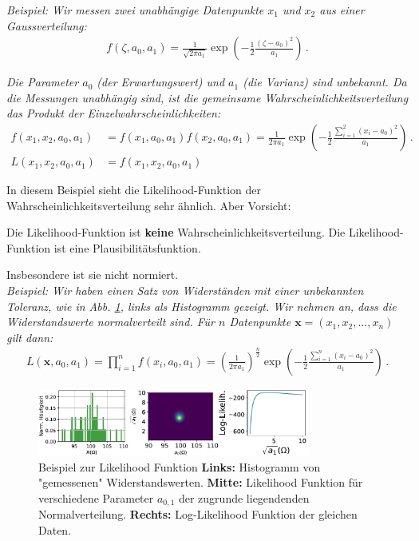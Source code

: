\textit{Beispiel: Wir messen zwei unabh\"angige Datenpunkte $x_1$ und $x_2$ aus einer Gaussverteilung:}
\begin{align}
f(\zeta, a_0, a_1) = \frac{1}{ \sqrt{ 2 \pi a_1 } } \exp \left( - \frac{1}{2} \frac{ (\zeta - a_0)^2 }{ a_1 } \right)\,.
\label{eq:vl8-4}
\end{align}

\textit{Die Parameter $a_0$ (der Erwartungswert) und $a_1$ (die Varianz) sind unbekannt. Da die Messungen unabh\"angig sind, ist die gemeinsame Wahrscheinlichkeitsverteilung das Produkt der Einzelwahrscheinlichkeiten:}
\begin{align}
f(x_1, x_2, a_0, a_1) &= f(x_1, a_0, a_1)f(x_2, a_0, a_1) = \frac{1}{ 2 \pi a_1 } \exp \left( - \frac{1}{2} \frac{ \sum_{i=1}^2 (x_i - a_0)^2 }{ a_1 } \right)\,. \\
L(x_1, x_2, a_0, a_1) &= f(x_1, x_2, a_0, a_1)
\label{eq:vl8-5}
\end{align}

In diesem Beispiel sieht die Likelihood-Funktion der Wahrscheinlichkeitsverteilung sehr \"ahnlich. Aber Vorsicht:

\begin{center}
\begin{tcolorbox}[enhanced,width=6in,drop fuzzy shadow southwest,
    colframe=red!50!black,colback=red!05]
   Die Likelihood-Funktion ist \textbf{keine} Wahrscheinlichkeitsverteilung. Die Likelihood-Funktion ist eine Plausibilitätsfunktion.
\end{tcolorbox}
\end{center}

Insbesondere ist sie nicht normiert.\\[0.3cm]
\textit{Beispiel: Wir haben einen Satz von Widerst\"anden mit einer unbekannten Toleranz, wie in Abb. \ref{fig:likelihood}, links als Histogramm gezeigt.
Wir nehmen an, dass die Widerstandswerte normalverteilt sind. F\"ur $n$ Datenpunkte $\boldsymbol{x} = (x_1, x_2, ..., x_n)$ gilt dann:}
\begin{align}
L(\boldsymbol{x}, a_0, a_1) =  \prod_{i = 1}^n f(x_i, a_0, a_1) = \left( \frac{1}{ 2 \pi a_1 } \right)^\frac{n}{2} \exp \left( - \frac{1}{2} \frac{ \sum_{i=1}^n (x_i - a_0)^2 }{ a_1 } \right)\,.
\label{eq:vl8-6}
\end{align}

\begin{figure}[tbp]
    \centering
        \includegraphics[width=0.8\textwidth]{Figures/likelihood_funktion.pdf}
        \caption{Beispiel zur Likelihood Funktion \textbf{Links:} Histogramm von "gemessenen" Widerstandswerten. \textbf{Mitte:} Likelihood Funktion für verschiedene Parameter $a_{0,1}$ der zugrunde liegendenden Normalverteilung. \textbf{Rechts:} Log-Likelihood Funktion der gleichen Daten. }
        \label{fig:likelihood}
\end{figure} 

